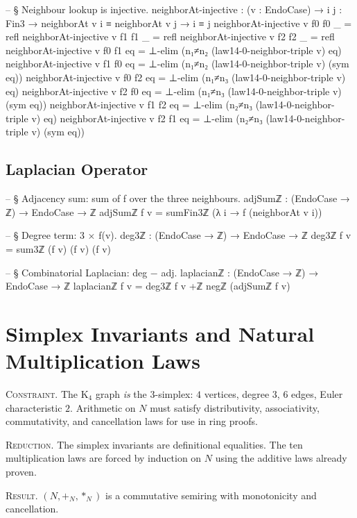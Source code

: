 \documentclass[11pt,a4paper]{book}
\def\mathbb#1{#1}%
\begin{document}
\begin{code}
-- § Neighbour lookup is injective.
neighborAt-injective : (v : EndoCase) → {i j : Fin3} → neighborAt v i ≡ neighborAt v j → i ≡ j
neighborAt-injective v {f0} {f0} _ = refl
neighborAt-injective v {f1} {f1} _ = refl
neighborAt-injective v {f2} {f2} _ = refl
neighborAt-injective v {f0} {f1} eq = ⊥-elim (n₁≠n₂ (law14-0-neighbor-triple v) eq)
neighborAt-injective v {f1} {f0} eq = ⊥-elim (n₁≠n₂ (law14-0-neighbor-triple v) (sym eq))
neighborAt-injective v {f0} {f2} eq = ⊥-elim (n₁≠n₃ (law14-0-neighbor-triple v) eq)
neighborAt-injective v {f2} {f0} eq = ⊥-elim (n₁≠n₃ (law14-0-neighbor-triple v) (sym eq))
neighborAt-injective v {f1} {f2} eq = ⊥-elim (n₂≠n₃ (law14-0-neighbor-triple v) eq)
neighborAt-injective v {f2} {f1} eq = ⊥-elim (n₂≠n₃ (law14-0-neighbor-triple v) (sym eq))
\end{code}

\section{Laplacian Operator}

\begin{code}
-- § Adjacency sum: sum of f over the three neighbours.
adjSumℤ : (EndoCase → ℤ) → EndoCase → ℤ
adjSumℤ f v = sumFin3ℤ (λ i → f (neighborAt v i))

-- § Degree term: 3 × f(v).
deg3ℤ : (EndoCase → ℤ) → EndoCase → ℤ
deg3ℤ f v = sum3ℤ (f v) (f v) (f v)

-- § Combinatorial Laplacian: deg − adj.
laplacianℤ : (EndoCase → ℤ) → EndoCase → ℤ
laplacianℤ f v = deg3ℤ f v +ℤ negℤ (adjSumℤ f v)
\end{code}

\chapter{Simplex Invariants and Natural Multiplication Laws}

\textsc{Constraint.}
The K$_4$ graph \emph{is} the $3$-simplex: $4$ vertices, degree $3$, $6$ edges,
Euler characteristic $2$. Arithmetic on $\mathbb{N}$ must satisfy distributivity,
associativity, commutativity, and cancellation laws for use in ring proofs.

\textsc{Reduction.}
The simplex invariants are definitional equalities. The ten multiplication laws
are forced by induction on $\mathbb{N}$ using the additive laws already proven.

\textsc{Result.}
$(\mathbb{N}, +_{\mathbb{N}}, *_{\mathbb{N}})$ is a commutative semiring with
monotonicity and cancellation.
\end{document}
